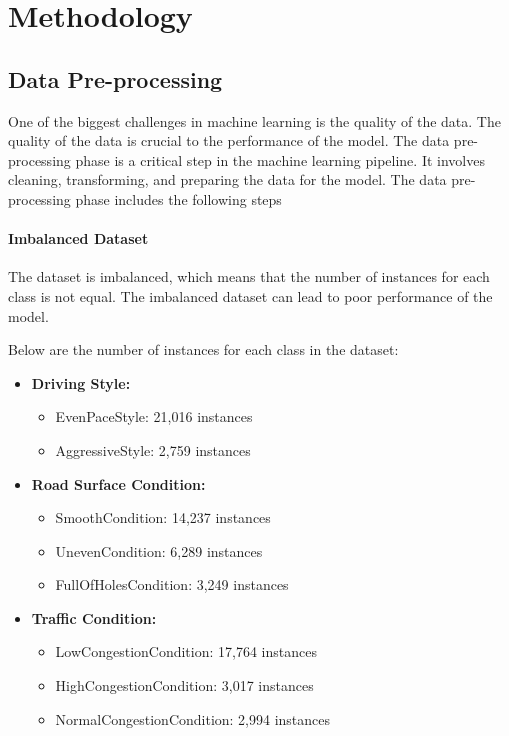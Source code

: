 \chapter{Methodology}

\section{Data Pre-processing}
One of the biggest challenges in machine learning is the quality of the data. The quality of the data is crucial to the performance of the model. 
The data pre-processing phase is a critical step in the machine learning pipeline. It involves cleaning, transforming, and preparing the data for the model. 
The data pre-processing phase includes the following steps

\subsubsection{Imbalanced Dataset}
The dataset is imbalanced, which means that the number of instances for each class is not equal. The imbalanced dataset can lead to poor performance of the model.

Below are the number of instances for each class in the dataset:    
\begin{itemize}
    \item \textbf{Driving Style:}
    \begin{itemize}
        \item EvenPaceStyle: 21,016 instances
        \item AggressiveStyle: 2,759 instances
    \end{itemize}
    \item \textbf{Road Surface Condition:}
    \begin{itemize}
        \item SmoothCondition: 14,237 instances
        \item UnevenCondition: 6,289 instances
        \item FullOfHolesCondition: 3,249 instances
    \end{itemize}
    \item \textbf{Traffic Condition:}
    \begin{itemize}
        \item LowCongestionCondition: 17,764 instances
        \item HighCongestionCondition: 3,017 instances
        \item NormalCongestionCondition: 2,994 instances
    \end{itemize}
\end{itemize}

